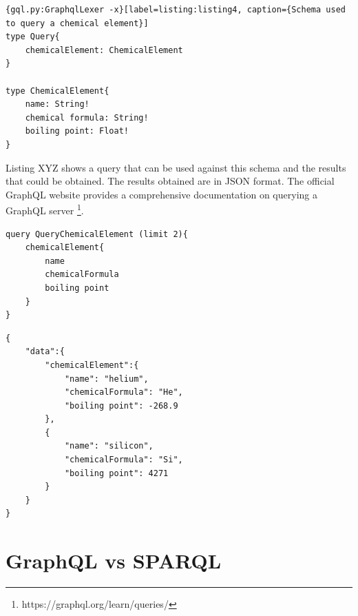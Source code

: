 \begin{minipage}{\linewidth}
\begin{lstlisting}{gql.py:GraphqlLexer -x}[label=listing:listing4, caption={Schema used to query a chemical element}]
type Query{
	chemicalElement: ChemicalElement
}

type ChemicalElement{
	name: String!
	chemical formula: String!
	boiling point: Float!
}

\end{lstlisting}
\end{minipage}

Listing XYZ shows a query that can be used against this schema and the results that could be obtained. The results obtained are in JSON format. The official GraphQL website provides a comprehensive documentation on querying a GraphQL server \footnote{ https://graphql.org/learn/queries/}. 

\begin{minipage}{\linewidth}
\begin{lstlisting}[label=listing:listing5, caption={Query to fetch chemical elements and their properties}]
query QueryChemicalElement (limit 2){
    chemicalElement{
		name
		chemicalFormula
		boiling point
	}
}
\end{lstlisting}
\end{minipage}

\begin{minipage}{\linewidth}
\begin{lstlisting}[label=listing:listing5, caption={Query to fetch chemical elements and their properties}]
{
	"data":{
		"chemicalElement":{
			"name": "helium",
			"chemicalFormula": "He",
			"boiling point": -268.9
		},
		{	
			"name": "silicon",
			"chemicalFormula": "Si",
			"boiling point": 4271
		}
	}
}

\end{lstlisting}
\end{minipage}

\section{GraphQL vs SPARQL}


